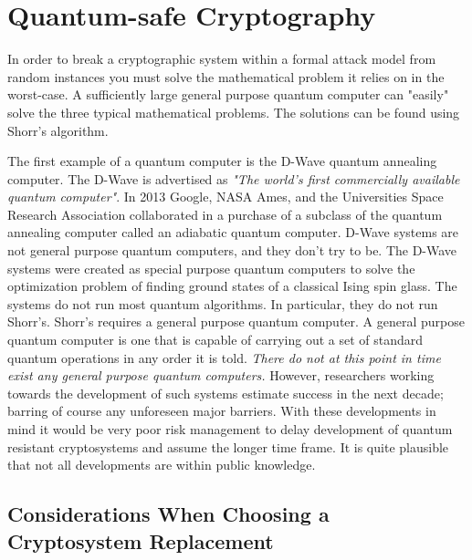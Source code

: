 \section{Quantum-safe Cryptography}

In order to break a cryptographic system within a formal attack model from random instances you must solve the mathematical problem it relies on in the worst-case. A sufficiently large general purpose quantum computer can "easily" solve the three typical mathematical problems. The solutions can be found using Shorr’s algorithm.

The first example of a quantum computer is the D-Wave quantum annealing computer. The D-Wave is advertised as 
\textit{"The world's first commercially available quantum computer"}. 
\newline 
In 2013 Google, NASA Ames, and the Universities Space Research Association collaborated in a purchase of a subclass of the quantum annealing computer called an adiabatic quantum computer. \newline 
D-Wave systems are not general purpose quantum computers, and they don't try to be. 
\newline 
The D-Wave systems were created as special purpose quantum computers to solve the optimization problem of finding ground states of a classical Ising spin glass. 
\newline  
The systems do not run most quantum algorithms. In particular, they do not run Shorr’s.
Shorr’s requires a general purpose quantum computer. 
\newline 
A general purpose quantum computer is one that is capable of carrying out a set of standard quantum operations in any order it is told.
\textit{There do not at this point in time exist any general purpose quantum computers.} 
\newline
However, researchers working towards the development of such systems estimate success in the next decade; barring of course any unforeseen major barriers.  
\newline 
With these developments in mind it would be very poor risk management to delay development of quantum resistant cryptosystems and assume the longer time frame. It is quite plausible that not all developments are within public knowledge. 

\subsection{Considerations When Choosing a Cryptosystem Replacement}

